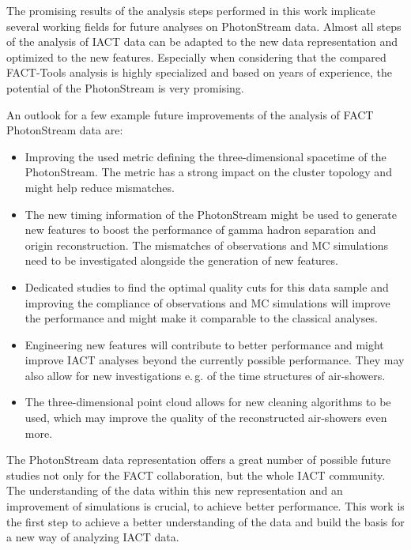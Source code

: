 
The promising results of the analysis steps performed in this work implicate
several working fields for future analyses on PhotonStream data. Almost
all steps of the analysis of IACT data can be adapted to the new data
representation and optimized to the new features. Especially when considering
that the compared FACT-Tools analysis is highly specialized and based on years
of experience, the potential of the PhotonStream is very promising.

An outlook for a few example future improvements of the analysis of FACT
PhotonStream data are:

\begin{itemize}
  \item Improving the used metric defining the three-dimensional spacetime of the PhotonStream. The metric has a strong impact on the cluster topology and might help reduce mismatches.
  \item The new timing information of the PhotonStream might be used to generate new features to boost the performance of gamma hadron separation and origin reconstruction. The mismatches of observations and MC simulations need to be investigated alongside the generation of new features.
  \item Dedicated studies to find the optimal quality cuts for this data sample and improving the compliance of observations and MC simulations will improve the performance and might make it comparable to the classical analyses.
  \item Engineering new features will contribute to better performance and might improve IACT analyses beyond the currently possible performance. They may also allow for new investigations e.\,g. of the time structures of air-showers.
  \item The three-dimensional point cloud allows for new cleaning algorithms to be used, which may improve the quality of the reconstructed air-showers even more.
\end{itemize}

The PhotonStream data representation offers a great number of possible future studies not only for the FACT collaboration, but the whole IACT community. The
understanding of the data within this new representation and an improvement of simulations is crucial, to achieve better performance. This work is the first step to achieve a better understanding of the data and build the basis for a new way of analyzing IACT data.
